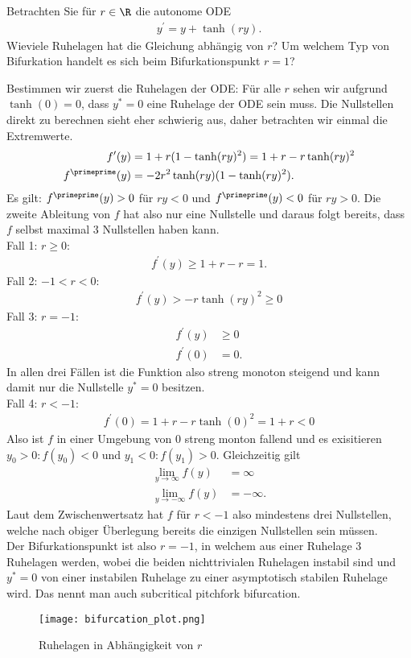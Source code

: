 \begin{exercise}
Betrachten Sie für $r \in \R$ die autonome ODE
\begin{align*}
  y^{\prime} = y + \tanh(ry).
\end{align*}
Wieviele Ruhelagen hat die Gleichung abhängig von $r$? Um welchem Typ von Bifurkation
handelt es sich beim Bifurkationspunkt $r = 1$?
\end{exercise}
\begin{solution}
Bestimmen wir zuerst die Ruhelagen der ODE:
Für alle $r$ sehen wir aufgrund $\tanh(0) = 0$, dass $y^* = 0$ eine Ruhelage der ODE
sein muss.
Die Nullstellen direkt zu berechnen sieht eher schwierig aus, daher betrachten wir
einmal die Extremwerte.
\begin{align*}
  f^{\prime}(y) &= 1 + r(1 - \tanh(ry)^2) = 1 + r - r\tanh(ry)^2 \\
  f^{\primeprime}(y) &= -2r^2\tanh(ry)(1 - \tanh(ry)^2).
\end{align*}
Es gilt: $f^{\primeprime}(y) > 0$ für $ry < 0$ und $f^{\primeprime}(y) < 0$ für $ry > 0$.
Die zweite Ableitung von $f$ hat also nur eine Nullstelle und daraus folgt bereits, dass
$f$ selbst maximal 3 Nullstellen haben kann.\\
Fall 1: $r \geq 0:$
\begin{align*}
  f^{\prime}(y) \geq 1 + r - r = 1.
\end{align*}
Fall 2: $-1 < r < 0$:
\begin{align*}
  f^{\prime}(y) > -r\tanh(ry)^2 \geq 0
\end{align*}
Fall 3: $r = -1$:
\begin{align*}
  f^{\prime}(y) &\geq 0 \\
  f^{\prime}(0) &= 0.
\end{align*}
In allen drei Fällen ist die Funktion also streng monoton steigend und kann damit
nur die Nullstelle $y^* = 0$ besitzen. \\
Fall 4: $r < -1$:
\begin{align*}
  f^{\prime}(0) = 1 + r - r\tanh(0)^2 = 1 + r < 0
\end{align*}
Also ist $f$ in einer Umgebung von $0$ streng monton fallend und es exisitieren
$y_0 > 0: f(y_0) < 0$ und $y_1 < 0: f(y_1) > 0$. Gleichzeitig gilt
\begin{align*}
  \lim_{y \to \infty} f(y) &= \infty \\
  \lim_{y \to -\infty} f(y) &= -\infty.
\end{align*}
Laut dem Zwischenwertsatz hat $f$ für $r < -1$ also mindestens drei Nullstellen,
welche nach obiger Überlegung bereits die einzigen Nullstellen sein müssen. \\
Der Bifurkationspunkt ist also $r = -1$, in welchem aus einer Ruhelage 3 Ruhelagen werden,
wobei die beiden nichttrivialen Ruhelagen instabil sind und $y^* = 0$
von einer instabilen Ruhelage zu einer asymptotisch stabilen Ruhelage wird.
Das nennt man auch \glqq subcritical pitchfork bifurcation\grqq. \\

\begin{figure}
    \centering
    \texttt{[image: bifurcation\_plot.png]}
    \caption{Ruhelagen in Abhängigkeit von $r$}
\end{figure}
\end{solution}
